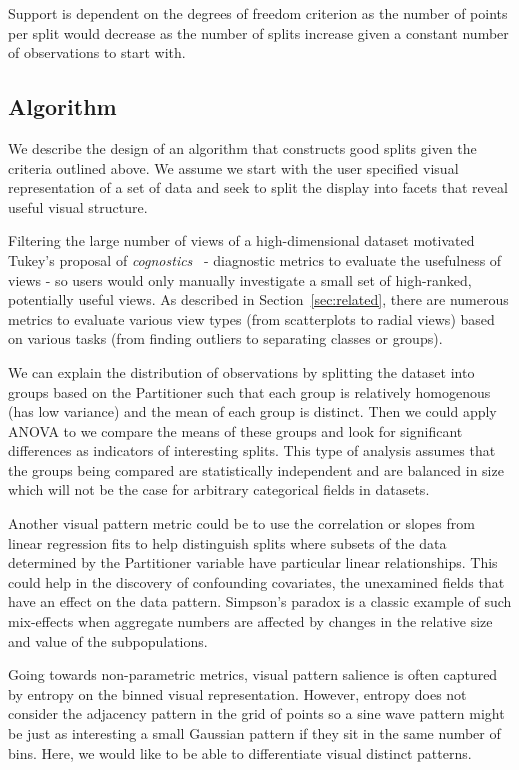 Support is dependent on the degrees of freedom criterion as the number of points per split would decrease as the number of splits increase given a constant number of observations to start with.

\subsection{Algorithm}
We describe the design of an algorithm that constructs good splits given the criteria outlined above. We assume we start with the user specified visual representation of a set of data and seek to split the display into facets that reveal useful visual structure.

Filtering the large number of views of a high-dimensional dataset motivated Tukey's proposal of \textit{cognostics}~\cite{Tukey1982,Tukey1985} - diagnostic metrics to evaluate the usefulness of views - so users would only manually investigate a small set of high-ranked, potentially useful views. As described in Section~\ref{sec:related}, there are numerous metrics to evaluate various view types (from scatterplots to radial views) based on various tasks (from finding outliers to separating classes or groups).

We can explain the distribution of observations by splitting the dataset into groups based on the Partitioner such that each group is relatively homogenous (has low variance) and the mean of each group is distinct. Then we could apply ANOVA to we compare the means of these groups and look for significant differences as indicators of interesting splits. This type of analysis assumes that the groups being compared are statistically independent and are balanced in size which will not be the case for arbitrary categorical fields in datasets. 

Another visual pattern metric could be to use the correlation or slopes from linear regression fits to help distinguish splits where subsets of the data determined by the Partitioner variable have particular linear relationships. This could help in the discovery of confounding covariates, the unexamined fields that have an effect on the data pattern. Simpson's paradox is a classic example of such mix-effects when aggregate numbers are affected by changes in the relative size and value of the subpopulations. 

Going towards non-parametric metrics, visual pattern salience is often captured by entropy on the binned visual representation. However, entropy does not consider the adjacency pattern in the grid of points so a sine wave pattern might be just as interesting a small Gaussian pattern if they sit in the same number of bins. Here, we would like to be able to differentiate visual distinct patterns.

